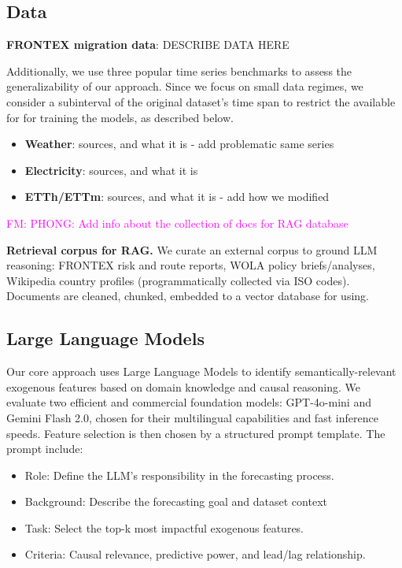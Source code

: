 \documentclass[conference]{IEEEtran}
\newcommand{\fm}[1]{\textcolor{magenta}{FM: #1}}
\begin{document}
\subsection{Data}

\textbf{FRONTEX migration data}: DESCRIBE DATA HERE

Additionally, we use three popular time series benchmarks to assess the generalizability of our approach. Since we focus on small data regimes, we consider a subinterval of the original dataset's time span to restrict the available for for training the models, as described below.

\begin{itemize}
    \item \textbf{Weather}: sources, and what it is - add problematic same series \cite{weather_dataset}
    \item \textbf{Electricity}: sources, and what it is \cite{electricity_dataset}
    \item \textbf{ETTh/ETTm}: sources, and what it is - add how we modified \cite{ett_dataset}\\
\end{itemize}
\fm{PHONG: Add info about the collection of docs for RAG database}

\textbf{Retrieval corpus for RAG.}
We curate an external corpus to ground LLM reasoning: FRONTEX risk and route reports, WOLA policy briefs/analyses, Wikipedia country profiles (programmatically collected via ISO codes). Documents are cleaned, chunked, embedded to a vector database for using.

\subsection{Large Language Models}

Our core approach uses Large Language Models to identify semantically-relevant exogenous features based on domain knowledge and causal reasoning. We evaluate two efficient and commercial foundation models: GPT-4o-mini and Gemini Flash 2.0, chosen for their multilingual capabilities and fast inference speeds. Feature selection is then chosen by a structured prompt template.
The prompt include:
\begin{itemize}
\item Role: Define the LLM's responsibility in the forecasting process.
\item Background: Describe the forecasting goal and dataset context
\item Task: Select the top-k most impactful exogenous features.
\item Criteria: Causal relevance, predictive power, and lead/lag relationship.
\end{itemize}
\end{document}
